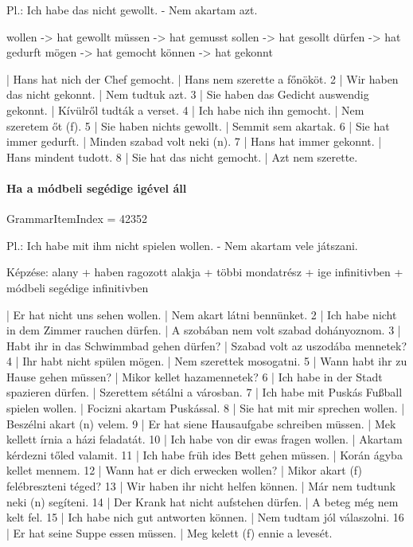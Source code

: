 \documentclass{article}
\newenvironment{desc}{\verbatim}{\endverbatim}
\newenvironment{exmp}{\verbatim}{\endverbatim}
\begin{document}
\begin{desc}
Pl.: Ich habe das nicht gewollt. - Nem akartam azt.

wollen -> hat gewollt
müssen -> hat gemusst
sollen -> hat gesollt
dürfen -> hat gedurft
mögen -> hat gemocht
können -> hat gekonnt
\end{desc}

\begin{exmp}
1 | Hans hat nich der Chef gemocht. | Hans nem szerette a főnököt.
2 | Wir haben das nicht gekonnt. | Nem tudtuk azt.
3 | Sie haben das Gedicht auswendig gekonnt. | Kívülről tudták a verset.
4 | Ich habe nich ihn gemocht. | Nem szeretem őt (f).
5 | Sie haben nichts gewollt. | Semmit sem akartak.
6 | Sie hat immer gedurft. | Minden szabad volt neki (n).
7 | Hans hat immer gekonnt. | Hans mindent tudott.
8 | Sie hat das nicht gemocht. | Azt nem szerette.
\end{exmp}

\paragraph{Ha a módbeli segédige igével áll}

GrammarItemIndex = 42352

\begin{desc}
Pl.: Ich habe mit ihm nicht spielen wollen. - Nem akartam vele játszani.

Képzése:
alany + haben ragozott alakja + többi mondatrész + ige infinitivben + módbeli segédige infinitivben
\end{desc}

\begin{exmp}
1 | Er hat nicht uns sehen wollen. | Nem akart látni bennünket.
2 | Ich habe nicht in dem Zimmer rauchen dürfen. | A szobában nem volt szabad dohányoznom.
3 | Habt ihr in das Schwimmbad gehen dürfen? | Szabad volt az uszodába mennetek?
4 | Ihr habt nicht spülen mögen. | Nem szerettek mosogatni.
5 | Wann habt ihr zu Hause gehen müssen? | Mikor kellet hazamennetek?
6 | Ich habe in der Stadt spazieren dürfen. | Szerettem sétálni a városban.
7 | Ich habe mit Puskás Fußball spielen wollen. | Focizni akartam Puskással.
8 | Sie hat mit mir sprechen wollen. | Beszélni akart (n) velem.
9 | Er hat siene Hausaufgabe schreiben müssen. | Mek kellett írnia a házi feladatát.
10 | Ich habe von dir ewas fragen wollen. | Akartam kérdezni tőled valamit.
11 | Ich habe früh ides Bett gehen müssen. | Korán ágyba kellet mennem.
12 | Wann hat er dich erwecken wollen? | Mikor akart (f) felébreszteni téged?
13 | Wir haben ihr nicht helfen können. | Már nem tudtunk neki (n) segíteni.
14 | Der Krank hat nicht aufstehen dürfen. | A beteg még nem kelt fel.
15 | Ich habe nich gut antworten können. | Nem tudtam jól válaszolni.
16 | Er hat seine Suppe essen müssen. | Meg kelett (f) ennie a levesét.
\end{exmp}
\end{document}
